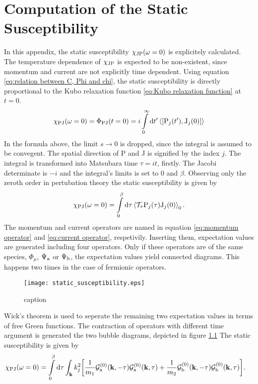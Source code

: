 %
%
\chapter{Computation of the Static Susceptibility}
\label{appch: static susceptibility}
%
%
In this appendix, the static susceptibility $\chi_{\mathrm{JP}}(\omega=0)$ is explicitely calculated.
The temperature dependence of $\chi_{\mathrm{JP}}$ is expected to be non-existent, since momentum and current are not explicitly time dependent.
Using equation \eqref{eq:relation between C, Phi and chi}, the static susceptibility is directly proportional to the Kubo relaxation function \eqref{eq:Kubo relaxation function} at $t=0$.
%
\begin{align}
	\chi_{\mt{PJ}}(\omega = 0) = \Phi_{\mt{PJ}}(t = 0) = i \int\limits_{0}^{\infty} \dd{t'} \expval{\comm{\mt{P}_{j}(t')}{\mt{J}_{j}(0)}}
\end{align}
%
In the formula above, the limit $s\to0$ is dropped, since the integral is assumed to be convegent.
The spatial direction of P and J is signified by the index $j$.
The integral is transformed into Matsubara time $\tau = it$, firstly.
The Jacobi determinate is $-i$ and the integral's limits is set to $0$ and $\beta$.
Observing only the zeroth order in pertubation theory the static susceptibility is given by
%
\begin{align}
	\chi_{\mathrm{PJ}}(\omega = 0) = \int\limits_{0}^{\beta} \dd{\tau} \expval{\mathcal{T}_{\tau} \mathrm{P}_{j}(\tau) \mathrm{J}_{j}(0)}_{0}.
\end{align}
%
The momentum and current operators are named in equation \eqref{eq:momentum operator} and \eqref{eq:current operator}, respetivily.
Inserting them, expectation values are generated including four operators.
Only if these operators are of the same species, $\Phi_{\mu}$, $\Psi_{\mathrm{a}}$ or $\Psi_{\mathrm{b}}$, the expectation values yield connected diagrams.
This happens two times in the case of fermionic operators.
%
\begin{figure}[t]
	\centering
	\texttt{[image: static\_susceptibility.eps]}
	\caption{caption}
	\label{fig:static susceptibility}
\end{figure}
%
Wick's theorem is used to seperate the remaining two expectation values in terms of free Green functions.
The contraction of operators with different time argument is generated the two bubble diagrams, depicted in figure \ref{fig:static susceptibility}
The static susceptibility is given by
%
\begin{align}
	\chi_{\mathrm{PJ}}(\omega = 0) &= 
		\int\limits_{0}^{\beta} \dd{\tau} 
		\int_{\vb{k}} 
		k_{j}^{2}
		\bigg[
			\frac{1}{m_{1}}
			\mathcal{G}_{\mathrm{a}}^{(0)}(\vb{k},-\tau)
			\mathcal{G}_{\mathrm{a}}^{(0)}(\vb{k},\tau)
			+
			\frac{1}{m_{2}}
			\mathcal{G}_{\mathrm{b}}^{(0)}(\vb{k},-\tau)
			\mathcal{G}_{\mathrm{b}}^{(0)}(\vb{k},\tau)
		\bigg].
\end{align}
